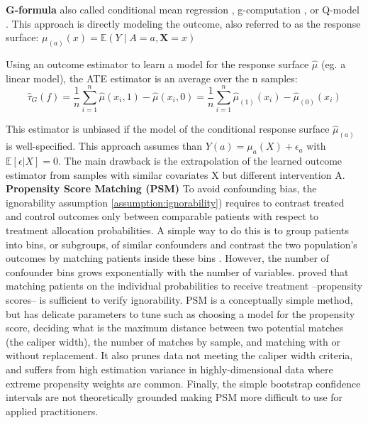 \documentclass[10pt,letterpaper]{article}
\begin{document}
\textbf{G-formula} also called conditional mean regression
\cite{wendling2018comparing}, g-computation \cite{robins1986role}, or
Q-model \cite{snowden2011implementation}. This approach is directly modeling
the outcome, also referred to as the response surface: $\mu_{(a)}(x)
    =\mathbb{E}\left(Y \mid A=a, \mathbf{X}=x\right)$

Using an outcome estimator to learn a model for the response surface $\hat
    \mu$ (eg. a linear model), the ATE estimator is an average over the n samples:
\begin{equation}
    \hat{\tau}_G(f) = \frac{1}{n} \sum_{i=1}^n \hat \mu(x_i, 1) - \hat \mu(x_i, 0) = \frac{1}{n} \sum_{i=1}^n \hat \mu_{(1)}(x_i) - \hat \mu_{(0)}(x_i)
\end{equation}

This estimator is unbiased if the model of the conditional response surface
$\hat \mu_{(a)}$ is well-specified. This approach assumes than $Y(a) =
    \mu_a(X) + \epsilon_a$ with $\mathbb E[\epsilon|X] = 0$. The main drawback is
the extrapolation of the learned outcome estimator from samples with similar
covariates X but different intervention A.\\

\textbf{Propensity Score Matching (PSM)} To avoid confounding bias, the
ignorability assumption \ref{assumption:ignorability}) requires to contrast
treated and control outcomes only between comparable patients with respect to
treatment allocation probabilities. A simple way to do this is to group
patients into bins, or subgroups, of similar confounders and contrast the two
population's outcomes by matching patients inside these bins
\cite{stuart2010matching}. However, the number of confounder bins grows
exponentially with the number of variables. \cite{rosenbaum1983central} proved
that matching patients on the individual probabilities to receive treatment
--propensity scores-- is sufficient to verify ignorability. PSM is a
conceptually simple method, but has delicate parameters to tune such as
choosing a model for the propensity score, deciding what is the maximum
distance between two potential matches (the caliper width), the number of
matches by sample, and matching with or without replacement. It also prunes data
not meeting the caliper width criteria, and suffers from high estimation
variance in highly-dimensional data where extreme propensity weights are common.
Finally, the simple bootstrap confidence intervals are not theoretically
grounded \cite{abadie2008failure} making PSM more difficult
to use for applied practitioners.\\
\end{document}
